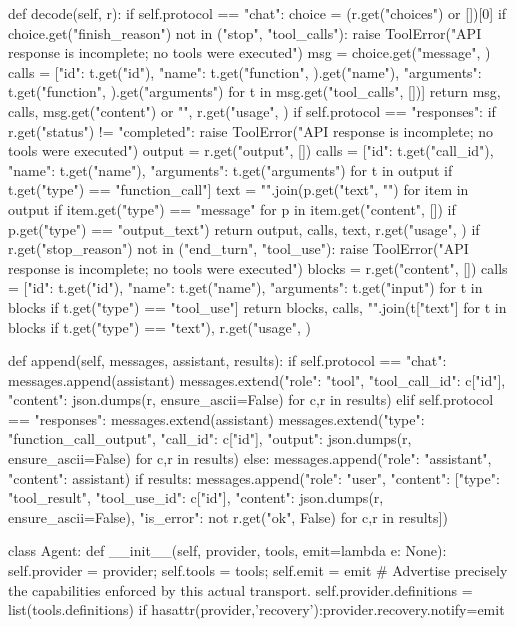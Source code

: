     def decode(self, r):
        if self.protocol == "chat":
            choice = (r.get("choices") or [{}])[0]
            if choice.get("finish_reason") not in ("stop", "tool_calls"):
                raise ToolError("API response is incomplete; no tools were executed")
            msg = choice.get("message", {})
            calls = [{"id": t.get("id"), "name": t.get("function", {}).get("name"),
                "arguments": t.get("function", {}).get("arguments")} for t in msg.get("tool_calls", [])]
            return msg, calls, msg.get("content") or "", r.get("usage", {})
        if self.protocol == "responses":
            if r.get("status") != "completed":
                raise ToolError("API response is incomplete; no tools were executed")
            output = r.get("output", [])
            calls = [{"id": t.get("call_id"), "name": t.get("name"), "arguments": t.get("arguments")}
                for t in output if t.get("type") == "function_call"]
            text = "\n".join(p.get("text", "") for item in output if item.get("type") == "message"
                for p in item.get("content", []) if p.get("type") == "output_text")
            return output, calls, text, r.get("usage", {})
        if r.get("stop_reason") not in ("end_turn", "tool_use"):
            raise ToolError("API response is incomplete; no tools were executed")
        blocks = r.get("content", [])
        calls = [{"id": t.get("id"), "name": t.get("name"), "arguments": t.get("input")}
            for t in blocks if t.get("type") == "tool_use"]
        return blocks, calls, "\n".join(t["text"] for t in blocks if t.get("type") == "text"), r.get("usage", {})

    def append(self, messages, assistant, results):
        if self.protocol == "chat":
            messages.append(assistant)
            messages.extend({"role": "tool", "tool_call_id": c["id"], "content": json.dumps(r, ensure_ascii=False)} for c,r in results)
        elif self.protocol == "responses":
            messages.extend(assistant)
            messages.extend({"type": "function_call_output", "call_id": c["id"], "output": json.dumps(r, ensure_ascii=False)} for c,r in results)
        else:
            messages.append({"role": "assistant", "content": assistant})
            if results:
                messages.append({"role": "user", "content": [{"type": "tool_result", "tool_use_id": c["id"],
                    "content": json.dumps(r, ensure_ascii=False), "is_error": not r.get("ok", False)} for c,r in results]})

class Agent:
    def __init__(self, provider, tools, emit=lambda e: None):
        self.provider = provider; self.tools = tools; self.emit = emit
        # Advertise precisely the capabilities enforced by this actual transport.
        self.provider.definitions = list(tools.definitions)
        if hasattr(provider,'recovery'):provider.recovery.notify=emit

